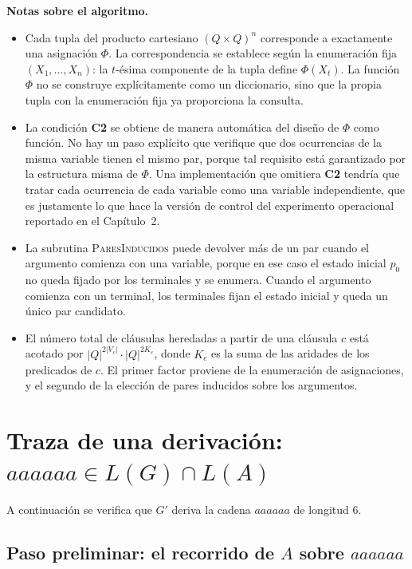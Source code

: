 \documentclass[11pt, letterpaper]{article}
\theoremstyle{definition}
\begin{document}
\textbf{Notas sobre el algoritmo.}

\begin{itemize}
\item Cada tupla del producto cartesiano $(Q \times Q)^n$ corresponde a exactamente una asignación $\Phi$. La correspondencia se establece según la enumeración fija $(X_1, \dots, X_n)$: la $t$-ésima componente de la tupla define $\Phi(X_t)$. La función $\Phi$ no se construye explícitamente como un diccionario, sino que la propia tupla con la enumeración fija ya proporciona la consulta.

\item La condición \textbf{C2} se obtiene de manera automática del diseño de $\Phi$ como función. No hay un paso explícito que verifique que dos ocurrencias de la misma variable tienen el mismo par, porque tal requisito está garantizado por la estructura misma de $\Phi$. Una implementación que omitiera \textbf{C2} tendría que tratar cada ocurrencia de cada variable como una variable independiente, que es justamente lo que hace la versión de control del experimento operacional reportado en el Capítulo~2.

\item La subrutina \textsc{ParesInducidos} puede devolver más de un par cuando el argumento comienza con una variable, porque en ese caso el estado inicial $p_0$ no queda fijado por los terminales y se enumera. Cuando el argumento comienza con un terminal, los terminales fijan el estado inicial y queda un único par candidato.

\item El número total de cláusulas heredadas a partir de una cláusula $c$ está acotado por $|Q|^{2 |V_c|} \cdot |Q|^{2 K_c}$, donde $K_c$ es la suma de las aridades de los predicados de $c$. El primer factor proviene de la enumeración de asignaciones, y el segundo de la elección de pares inducidos sobre los argumentos.
\end{itemize}

\section{Traza de una derivación: $aaaaaa \in L(G) \cap L(A)$}

A continuación se verifica que $G'$ deriva la cadena $aaaaaa$ de longitud 6.

\subsection{Paso preliminar: el recorrido de $A$ sobre $aaaaaa$}
\end{document}

